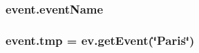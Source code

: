 \subsubsection[{event\+Name}]{\setlength{\rightskip}{0pt plus 5cm}event.\+event\+Name}\label{namespaceevent_a1e413701a83979f324a7fd7aa9c3e283}
\subsubsection[{tmp}]{\setlength{\rightskip}{0pt plus 5cm}event.\+tmp = ev.\+get\+Event(\char`\"{}Paris\char`\"{})}\label{namespaceevent_ae67d61b8ffca013282db2f622b539558}
